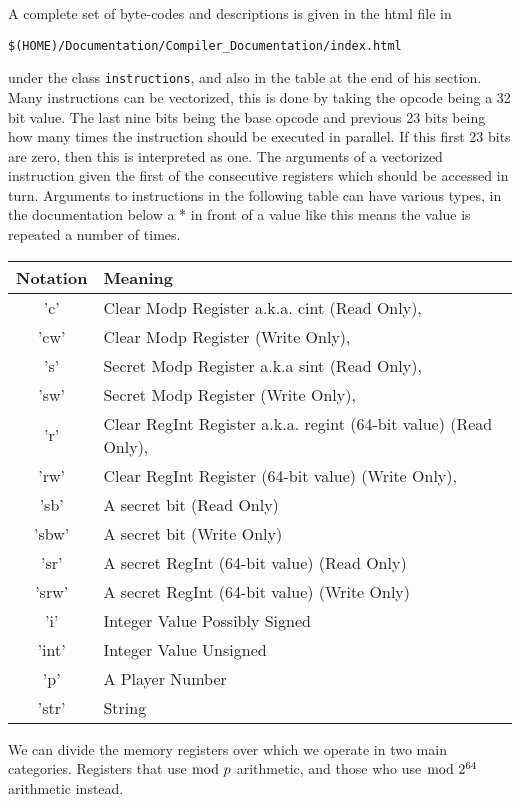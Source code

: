 A complete set of byte-codes and descriptions is
given in the html file in
\begin{center}
   \verb+$(HOME)/Documentation/Compiler_Documentation/index.html+
\end{center}
under the class \verb+instructions+, and also in the table at the
end of his section.
Many instructions can be vectorized, this is done by taking the opcode
being a 32 bit value. The last nine bits being the base opcode and previous
23 bits being how many times the instruction should be executed in
parallel. If this first 23 bits are zero, then this is interpreted as
one. The arguments of a vectorized instruction given the first
of the consecutive registers which should be accessed in turn.
Arguments to instructions in the following table can have various types,
in the documentation below a * in front of a value like this means
the value is repeated a number of times.
\begin{center}
\begin{tabular}{|c|l|}
\hline
Notation  & Meaning \\
\hline
    'c'   & Clear Modp Register a.k.a. cint (Read Only), \\
    'cw'  & Clear Modp Register (Write Only), \\
    's'   & Secret Modp Register a.k.a sint (Read Only), \\
    'sw'  & Secret Modp Register (Write Only), \\
    'r'   & Clear RegInt Register a.k.a. regint (64-bit value) (Read Only), \\
    'rw'  & Clear RegInt Register (64-bit value) (Write Only), \\
    'sb'  & A secret bit (Read Only) \\
    'sbw' & A secret bit (Write Only) \\
    'sr'  & A secret RegInt (64-bit value) (Read Only) \\
    'srw' & A secret RegInt (64-bit value) (Write Only) \\
    'i'   & Integer Value Possibly Signed \\
    'int' & Integer Value Unsigned \\
    'p'   & A Player Number \\
    'str' & String \\
\hline
\end{tabular}
\end{center}
We can divide the memory registers over which we operate in two main categories.
Registers that use $\bmod \; p$ arithmetic, and those who use $\bmod \; 2^{64}$ arithmetic instead.
